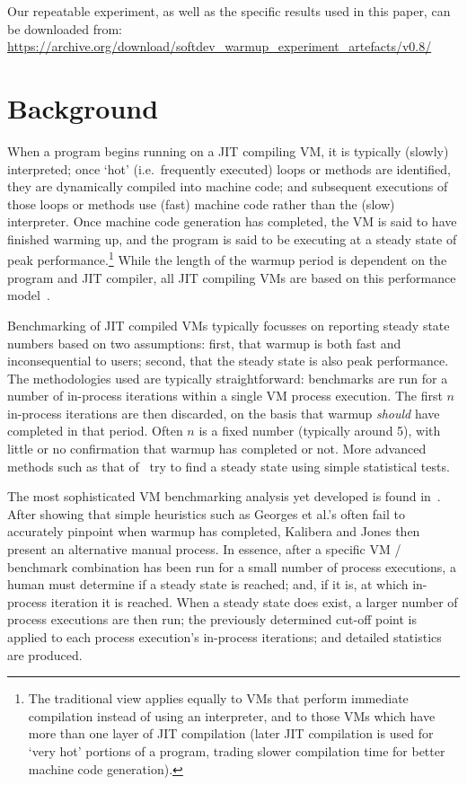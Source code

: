 \documentclass[acmsmall]{acmart}\settopmatter{printfolios=true}
\newcommand{\kalibera}{Kalibera and Jones\xspace}
\begin{document}
Our repeatable experiment, as well as the specific results used
in this paper, can be downloaded from:
\url{https://archive.org/download/softdev_warmup_experiment_artefacts/v0.8/}


\section{Background}
\label{sec:warmup}

When a program begins running on a JIT compiling VM, it is typically (slowly)
interpreted; once `hot' (i.e.~frequently executed) loops or methods are
identified, they are dynamically compiled into machine code; and subsequent
executions of those loops or methods use (fast) machine code rather than the
(slow) interpreter. Once machine code generation has completed, the VM is
said to have finished warming up, and the program is said to be executing
at a steady state of peak performance.\footnote{The traditional view applies equally to VMs
that perform immediate compilation instead of using an interpreter, and to
those VMs which have more than one layer of JIT compilation (later JIT
compilation is used for `very hot' portions of a program, trading slower
compilation time for better machine code generation).}
While the length of the warmup period
is dependent on the program and JIT compiler, all JIT compiling
VMs are based on this performance model~\cite{kalibera13rigorous}.

Benchmarking of JIT compiled VMs typically focusses on reporting
steady state numbers based on two assumptions: first, that warmup is both fast and
inconsequential to users; second, that the steady state is also peak performance.
The methodologies used are typically straightforward: benchmarks are run for a number
of in-process iterations within a single VM process execution.
The first $n$ in-process iterations
are then discarded, on the basis that warmup \emph{should} have completed in
that period. Often $n$ is a fixed number (typically around 5), with little or no confirmation
that warmup has completed or not. More advanced methods such as
that of~\citet{georges07statistically} try to find a steady state
using simple statistical tests.

The most sophisticated VM benchmarking analysis yet developed is found
in~\cite{kalibera12quantifying,kalibera13rigorous}. After
showing that simple heuristics such as Georges et al.'s often fail to accurately
pinpoint when warmup has completed, \kalibera then present an alternative manual
process. In essence, after a specific VM / benchmark combination has been run for a small number of
process executions, a human must determine if a steady state is reached;
and, if it is, at which in-process iteration
it is reached. When a steady state does exist, a larger number of process executions are then
run; the previously determined cut-off point is applied to each process execution's
in-process iterations; and detailed statistics are produced.
\end{document}
